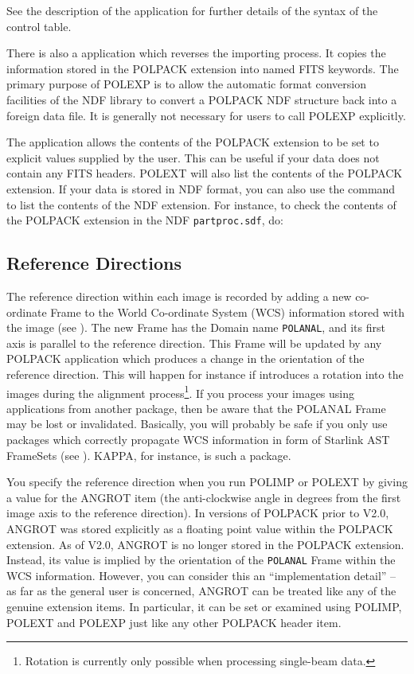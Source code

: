 \documentclass[twoside,11pt]{starlink}
\begin{document}
See the description of the  application for
further details of the syntax of the control table.

There is also a  application which reverses the
importing process. It copies the information stored in the POLPACK
extension into named FITS keywords. The primary purpose of POLEXP is
to allow the automatic format conversion facilities of the NDF library to
convert a POLPACK NDF structure back into a foreign data file.
It is generally not necessary for users to call POLEXP explicitly.

The  application allows the contents of the
POLPACK extension to be set to explicit values supplied by the user. This
can be useful if your data does not contain any FITS headers. POLEXT will
also list the contents of the POLPACK extension. If your data is stored
in NDF format, you can also use the 
command to list the contents of the NDF extension. For instance, to check
the contents of the POLPACK extension in the NDF \verb+partproc.sdf+, do:

\begin{terminalv}
\end{terminalv}

\subsection{Reference Directions}
The reference direction within each image is recorded by adding a new
co-ordinate Frame to the World Co-ordinate System (WCS) information
stored with the image (see ). The new
Frame has the Domain name \verb+POLANAL+,
and its first axis is parallel to the reference direction. This Frame
will be updated by any POLPACK application which produces a change in the
orientation of the reference direction. This will happen
for instance if  introduces a rotation into the
images during the alignment process\footnote{Rotation is currently only
possible when processing single-beam data.}. If you process your images
using applications from another package, then be aware that the POLANAL Frame
may be lost or invalidated. Basically,
you will probably be safe if you only use packages which correctly
propagate WCS information in form of Starlink AST FrameSets (see
). KAPPA, for instance, is such a package.

You specify the reference direction when you run POLIMP or POLEXT by
giving a value for the ANGROT item (the anti-clockwise angle in degrees
from the first image axis to the reference direction). In versions of
POLPACK prior to V2.0, ANGROT was stored explicitly as a floating point
value within the POLPACK extension. As of V2.0, ANGROT is no longer
stored in the POLPACK extension. Instead, its value is implied by the
orientation of the \verb+POLANAL+ Frame within the WCS information.
However, you can consider this an ``implementation detail'' -- as far as
the general user is concerned, ANGROT can be treated like any of the
genuine extension items. In particular, it can be set or examined using
POLIMP, POLEXT and POLEXP just like any other POLPACK header item.
\end{document}
